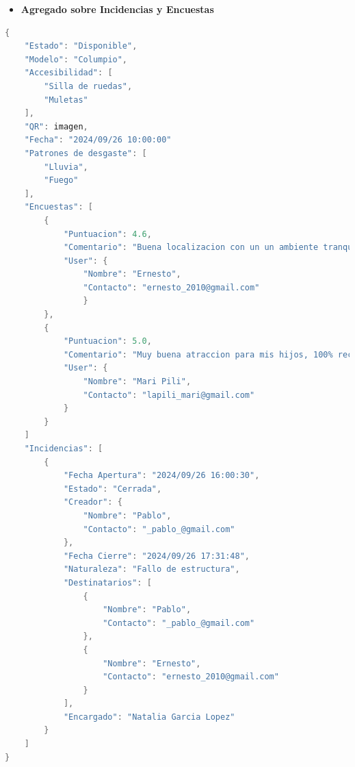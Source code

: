 \documentclass[]{article}
\begin{document}
\begin{itemize}
    \item \textbf{Agregado sobre Incidencias y Encuestas}
\end{itemize}
\begin{lstlisting}[caption=Ejemplo de JSON para Agregado sobre Indicencias y Encuestas, language=C]
{
    "Estado": "Disponible",
    "Modelo": "Columpio",
    "Accesibilidad": [
        "Silla de ruedas",
        "Muletas"
    ],
    "QR": imagen,
    "Fecha": "2024/09/26 10:00:00"
    "Patrones de desgaste": [
        "Lluvia",
        "Fuego"
    ],
    "Encuestas": [
        {
            "Puntuacion": 4.6,
            "Comentario": "Buena localizacion con un un ambiente tranquilo",
            "User": {
                "Nombre": "Ernesto",
                "Contacto": "ernesto_2010@gmail.com"
                }
        },
        {
            "Puntuacion": 5.0,
            "Comentario": "Muy buena atraccion para mis hijos, 100% recomendado",
            "User": {
                "Nombre": "Mari Pili",
                "Contacto": "lapili_mari@gmail.com"
            }
        }
    ]
    "Incidencias": [
        {
            "Fecha Apertura": "2024/09/26 16:00:30",
            "Estado": "Cerrada",
            "Creador": {
                "Nombre": "Pablo",
                "Contacto": "_pablo_@gmail.com"
            },
            "Fecha Cierre": "2024/09/26 17:31:48",
            "Naturaleza": "Fallo de estructura",
            "Destinatarios": [
                {
                    "Nombre": "Pablo",
                    "Contacto": "_pablo_@gmail.com"
                },
                {
                    "Nombre": "Ernesto",
                    "Contacto": "ernesto_2010@gmail.com"
                }
            ],
            "Encargado": "Natalia Garcia Lopez"
        }
    ]
}
\end{lstlisting}

\newpage
\end{document}
